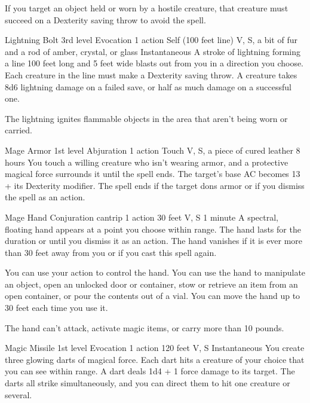 \documentclass[10pt,a4paper,twoside,bg=print,twocolumn,openany,nodeprecatedcode]{dndbook}
\begin{document}
If you target an object held or worn by a hostile creature, that creature must succeed on a Dexterity saving throw to avoid the spell.



\DndSpellHeader%
{Lightning Bolt}
{3rd level Evocation}
{1 action}
{Self (100 feet line)}
{V, S, a bit of fur and a rod of amber, crystal, or glass}
{Instantaneous}
A stroke of lightning forming a line 100 feet long and 5 feet wide blasts out from you in a direction you choose. Each creature in the line must make a Dexterity saving throw. A creature takes 8d6 lightning damage on a failed save, or half as much damage on a successful one.

The lightning ignites flammable objects in the area that aren't being worn or carried.



\DndSpellHeader%
{Mage Armor}
{1st level Abjuration}
{1 action}
{Touch}
{V, S, a piece of cured leather}
{8 hours}
You touch a willing creature who isn't wearing armor, and a protective magical force surrounds it until the spell ends. The target's base AC becomes 13 + its Dexterity modifier. The spell ends if the target dons armor or if you dismiss the spell as an action.



\DndSpellHeader%
{Mage Hand}
{Conjuration cantrip}
{1 action}
{30 feet}
{V, S}
{1 minute}
A spectral, floating hand appears at a point you choose within range. The hand lasts for the duration or until you dismiss it as an action. The hand vanishes if it is ever more than 30 feet away from you or if you cast this spell again.

You can use your action to control the hand. You can use the hand to manipulate an object, open an unlocked door or container, stow or retrieve an item from an open container, or pour the contents out of a vial. You can move the hand up to 30 feet each time you use it.

The hand can't attack, activate magic items, or carry more than 10 pounds.



\DndSpellHeader%
{Magic Missile}
{1st level Evocation}
{1 action}
{120 feet}
{V, S}
{Instantaneous}
You create three glowing darts of magical force. Each dart hits a creature of your choice that you can see within range. A dart deals 1d4 + 1 force damage to its target. The darts all strike simultaneously, and you can direct them to hit one creature or several.
\end{document}
